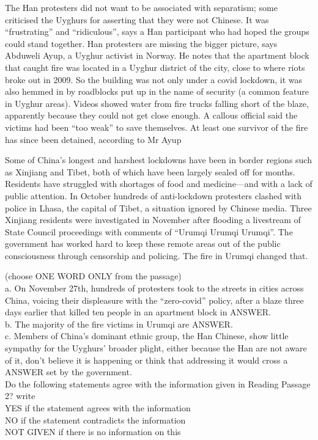 \documentclass[10pt, a4paper, oneside]{article}
\begin{document}
\begin{spacing}{2.0}
The Han protesters did not want to be associated with separatism; some criticised the Uyghurs for asserting that they were not Chinese. 
It was “frustrating” and “ridiculous”, says a Han participant who had hoped the groups could stand together. Han protesters are missing 
the bigger picture, says Abduweli Ayup, a Uyghur activist in Norway. He notes that the apartment block that caught fire was located in a 
Uyghur district of the city, close to where riots broke out in 2009. So the building was not only under a covid lockdown, it was also 
hemmed in by roadblocks put up in the name of security (a common feature in Uyghur areas). Videos showed water from fire trucks falling 
short of the blaze, apparently because they could not get close enough. A callous official said the victims had been “too weak” to save 
themselves. At least one survivor of the fire has since been detained, according to Mr Ayup

Some of China's longest and harshest lockdowns have been in border regions such as Xinjiang and Tibet, both of which have been 
largely sealed off for months. Residents have struggled with shortages of food and medicine—and with a lack of public attention. 
In October hundreds of anti-lockdown protesters clashed with police in Lhasa, the capital of Tibet, a situation ignored by Chinese media. 
Three Xinjiang residents were investigated in November after flooding a livestream of State Council proceedings with comments of 
“Urumqi Urumqi Urumqi”. The government has worked hard to keep these remote areas out of the public consciousness through censorship 
and policing. The fire in Urumqi changed that.

(choose ONE WORD ONLY from the passage)\\
a. On November 27th, hundreds of protesters took to the streets in cities across China, voicing their displeasure with 
the “zero-covid” policy, after a blaze three days earlier that killed ten people in an apartment block in ANSWER.\\
b. The majority of the fire victims in Urumqi are ANSWER.\\
c. Members of China's dominant ethnic group, the Han Chinese, show little sympathy for the Uyghurs' broader plight, 
either because the Han are not aware of it, don't believe it is happening or think that addressing 
it would cross a ANSWER set by the government.\\

Do the following statements agree with the information given in Reading Passage 2?
write\\
YES if the statement agrees with the information\\
NO if the statement contradicts the information\\
NOT GIVEN if there is no information on this\\


\end{spacing}
\end{document}
